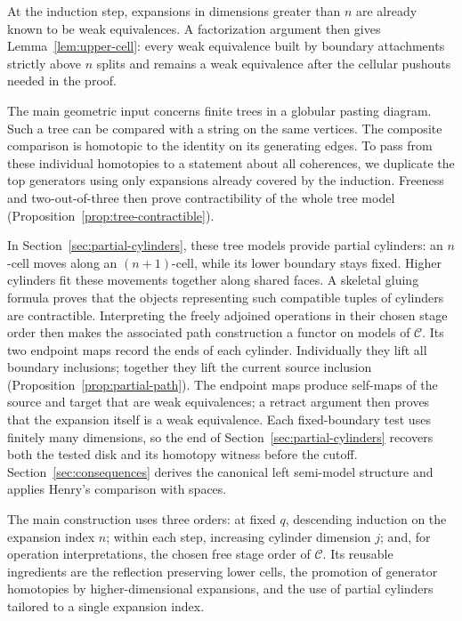 \documentclass[11pt,letterpaper]{article}
\numberwithin{equation}{section}
\theoremstyle{plain}
\theoremstyle{definition}
\theoremstyle{remark}
\begin{document}
At the induction step, expansions in dimensions greater than \(n\)
are already known to be weak equivalences.  A factorization argument
then gives Lemma~\ref{lem:upper-cell}: every weak equivalence built by boundary attachments
strictly above \(n\) splits and remains a weak equivalence after the
cellular pushouts needed in the proof.

The main geometric input concerns finite trees in a globular
pasting diagram.  Such a tree can be compared with a string on the same
vertices.  The composite comparison is homotopic to the identity on its
generating edges.  To pass from these individual homotopies
to a statement about all coherences, we duplicate the top generators
using only expansions already covered by the induction.
Freeness and two-out-of-three then prove contractibility of the whole
tree model (Proposition~\ref{prop:tree-contractible}).

In Section~\ref{sec:partial-cylinders}, these tree models provide partial
cylinders: an \(n\)-cell moves along an \((n+1)\)-cell, while its
lower boundary stays fixed.  Higher cylinders fit these movements
together along shared faces.  A skeletal gluing formula proves that
the objects representing such compatible tuples of cylinders are
contractible.  Interpreting the freely adjoined operations in their
chosen stage order then makes the associated path construction a functor on
models of \(\mathcal C\).  Its two endpoint maps record the ends of
each cylinder.  Individually they lift all boundary inclusions; together
they lift the current source inclusion (Proposition~\ref{prop:partial-path}).
The endpoint maps produce self-maps of the source and target that are
weak equivalences; a retract argument then proves that the expansion
itself is a weak equivalence.  Each fixed-boundary
test uses finitely many dimensions, so the end of
Section~\ref{sec:partial-cylinders} recovers
both the tested disk and its homotopy witness before the cutoff.
Section~\ref{sec:consequences} derives the canonical left semi-model
structure and applies Henry's comparison with spaces.

The main construction uses three orders: at fixed \(q\), descending
induction on the expansion index \(n\); within each step, increasing
cylinder dimension \(j\); and, for operation interpretations, the
chosen free stage order of \(\mathcal C\).
Its reusable ingredients are the reflection
preserving lower cells, the promotion of generator homotopies by
higher-dimensional expansions, and the use of partial cylinders tailored
to a single expansion index.
\end{document}
